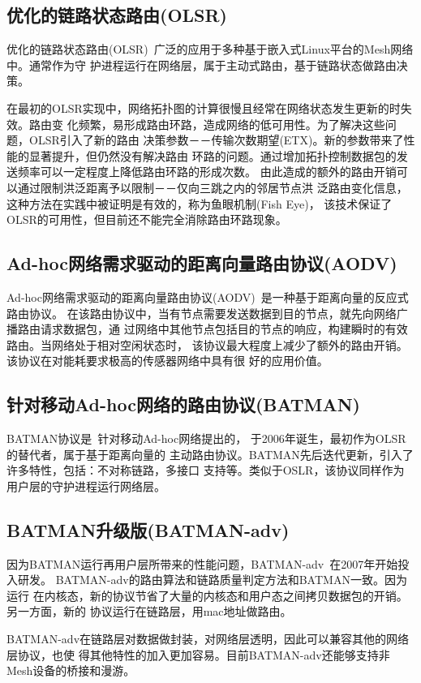 \subsection{优化的链路状态路由(OLSR)}
优化的链路状态路由(OLSR)~\cite{OLSR}广泛的应用于多种基于嵌入式Linux平台的Mesh网络中。通常作为守
护进程运行在网络层，属于主动式路由，基于链路状态做路由决策。

在最初的OLSR实现中，网络拓扑图的计算很慢且经常在网络状态发生更新的时失效。路由变
化频繁，易形成路由环路，造成网络的低可用性。为了解决这些问题，OLSR引入了新的路由
决策参数－－传输次数期望(ETX)。新的参数带来了性能的显著提升，但仍然没有解决路由
环路的问题。通过增加拓扑控制数据包的发送频率可以一定程度上降低路由环路的形成次数。
由此造成的额外的路由开销可以通过限制洪泛距离予以限制－－仅向三跳之内的邻居节点洪
泛路由变化信息，这种方法在实践中被证明是有效的，称为鱼眼机制(Fish Eye)，
该技术保证了OLSR的可用性，但目前还不能完全消除路由环路现象。

\subsection{Ad-hoc网络需求驱动的距离向量路由协议(AODV)}
Ad-hoc网络需求驱动的距离向量路由协议(AODV)~\cite{AODV}是一种基于距离向量的反应式路由协议。
在该路由协议中，当有节点需要发送数据到目的节点，就先向网络广播路由请求数据包，通
过网络中其他节点包括目的节点的响应，构建瞬时的有效路由。当网络处于相对空闲状态时，
该协议最大程度上减少了额外的路由开销。该协议在对能耗要求极高的传感器网络中具有很
好的应用价值。

\subsection{针对移动Ad-hoc网络的路由协议(BATMAN)}
BATMAN协议是~\cite{BATMAN}针对移动Ad-hoc网络提出的，
于2006年诞生，最初作为OLSR的替代者，属于基于距离向量的
主动路由协议。BATMAN先后迭代更新，引入了许多特性，包括：不对称链路，多接口
支持等。类似于OSLR，该协议同样作为用户层的守护进程运行网络层。

\subsection{BATMAN升级版(BATMAN-adv)}
因为BATMAN运行再用户层所带来的性能问题，BATMAN-adv~\cite{BATMAN-adv}在2007年开始投入研发。
BATMAN-adv的路由算法和链路质量判定方法和BATMAN一致。因为运行
在内核态，新的协议节省了大量的内核态和用户态之间拷贝数据包的开销。另一方面，新的
协议运行在链路层，用mac地址做路由。

BATMAN-adv在链路层对数据做封装，对网络层透明，因此可以兼容其他的网络层协议，也使
得其他特性的加入更加容易。目前BATMAN-adv还能够支持非Mesh设备的桥接和漫游。

